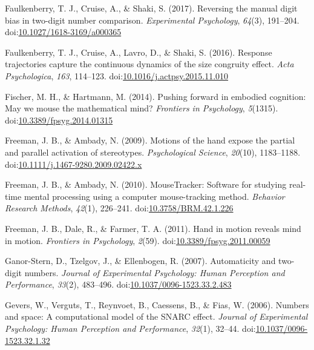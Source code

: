 \documentclass[english,man]{apa6}
\theoremstyle{definition}
\theoremstyle{definition}
\theoremstyle{definition}
\theoremstyle{remark}
\begin{document}
\hypertarget{ref-faulkenberry2017}{}
Faulkenberry, T. J., Cruise, A., \& Shaki, S. (2017). Reversing the
manual digit bias in two-digit number comparison. \emph{Experimental
Psychology}, \emph{64}(3), 191--204.
doi:\href{https://doi.org/10.1027/1618-3169/a000365}{10.1027/1618-3169/a000365}

\hypertarget{ref-faulkenberryShaki2016}{}
Faulkenberry, T. J., Cruise, A., Lavro, D., \& Shaki, S. (2016).
Response trajectories capture the continuous dynamics of the size
congruity effect. \emph{Acta Psychologica}, \emph{163}, 114--123.
doi:\href{https://doi.org/10.1016/j.actpsy.2015.11.010}{10.1016/j.actpsy.2015.11.010}

\hypertarget{ref-fischerHartmann2014}{}
Fischer, M. H., \& Hartmann, M. (2014). Pushing forward in embodied
cognition: May we mouse the mathematical mind? \emph{Frontiers in
Psychology}, \emph{5}(1315).
doi:\href{https://doi.org/10.3389/fpsyg.2014.01315}{10.3389/fpsyg.2014.01315}

\hypertarget{ref-freeman2009motions}{}
Freeman, J. B., \& Ambady, N. (2009). Motions of the hand expose the
partial and parallel activation of stereotypes. \emph{Psychological
Science}, \emph{20}(10), 1183--1188.
doi:\href{https://doi.org/10.1111/j.1467-9280.2009.02422.x}{10.1111/j.1467-9280.2009.02422.x}

\hypertarget{ref-freemanAmbady2010}{}
Freeman, J. B., \& Ambady, N. (2010). MouseTracker: Software for
studying real-time mental processing using a computer mouse-tracking
method. \emph{Behavior Research Methods}, \emph{42}(1), 226--241.
doi:\href{https://doi.org/10.3758/BRM.42.1.226}{10.3758/BRM.42.1.226}

\hypertarget{ref-freemanDaleFarmer2011}{}
Freeman, J. B., Dale, R., \& Farmer, T. A. (2011). Hand in motion
reveals mind in motion. \emph{Frontiers in Psychology}, \emph{2}(59).
doi:\href{https://doi.org/10.3389/fpsyg.2011.00059}{10.3389/fpsyg.2011.00059}

\hypertarget{ref-ganorStern2007}{}
Ganor-Stern, D., Tzelgov, J., \& Ellenbogen, R. (2007). Automaticity and
two-digit numbers. \emph{Journal of Experimental Psychology: Human
Perception and Performance}, \emph{33}(2), 483--496.
doi:\href{https://doi.org/10.1037/0096-1523.33.2.483}{10.1037/0096-1523.33.2.483}

\hypertarget{ref-gevers2006}{}
Gevers, W., Verguts, T., Reynvoet, B., Caessens, B., \& Fias, W. (2006).
Numbers and space: A computational model of the SNARC effect.
\emph{Journal of Experimental Psychology: Human Perception and
Performance}, \emph{32}(1), 32--44.
doi:\href{https://doi.org/10.1037/0096-1523.32.1.32}{10.1037/0096-1523.32.1.32}
\end{document}

